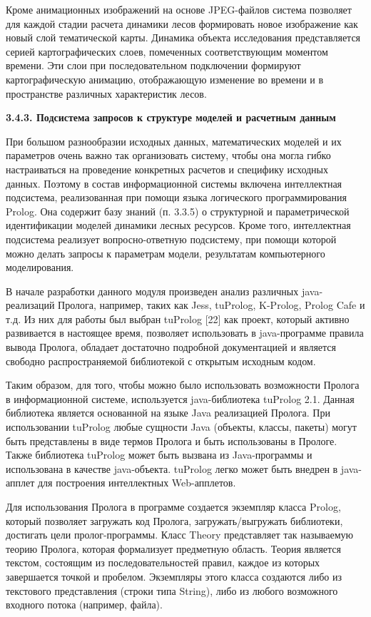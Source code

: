\documentclass{article}
\begin{document}
Кроме анимационных изображений на основе JPEG-файлов 
система позволяет для каждой стадии расчета 
динамики лесов формировать новое изображение 
как новый слой тематической карты. Динамика 
объекта исследования представляется серией 
картографических слоев, помеченных соответствующим 
моментом времени. Эти слои при последовательном 
подключении формируют картографическую анимацию, 
отображающую изменение во времени и в пространстве 
различных характеристик лесов.\label{HToc128995783}\label{HToc199746739}

\textbf{3.4.3. Подсистема запросов к структуре моделей 
и расчетным данным }

При большом разнообразии исходных данных, математических 
моделей и их параметров очень важно так организовать 
систему, чтобы она могла гибко настраиваться 
на проведение конкретных расчетов и специфику 
исходных данных. Поэтому в состав информационной 
системы включена интеллектная подсистема, 
реализованная при помощи языка логического 
программирования Prolog. Она содержит базу знаний 
(п. 3.3.5) \label{OLEHLINK36}\label{OLEHLINK37}о структурной и параметрической 
идентификации моделей динамики лесных ресурсов. 
Кроме того, интеллектная подсистема реализует 
вопросно-ответную подсистему, при помощи которой 
можно делать запросы к параметрам модели, результатам 
компьютерного моделирования.

В начале разработки данного модуля произведен 
анализ различных java-реализаций Пролога, например, 
таких как Jess, tuProlog, K-Prolog, Prolog Cafe и т.д. Из них для 
работы был выбран tuProlog [22] как проект, который 
активно развивается в настоящее время, позволяет 
использовать в java-программе правила вывода 
Пролога, обладает достаточно подробной документацией 
и является свободно распространяемой библиотекой 
с открытым исходным кодом.

Таким образом, для того, чтобы можно было использовать 
возможности Пролога в информационной системе, 
используется java-библиотека \label{OLEHLINK2}tuProlog 2.1. 
Данная библиотека является основанной на языке 
Java реализацией Пролога. При использовании tuProlog 
любые сущности Java (объекты, классы, пакеты) могут 
быть представлены в виде термов Пролога и быть 
использованы в Прологе. Также библиотека tuProlog 
может быть вызвана из Java-программы и использована 
в качестве java-объекта. tuProlog легко может быть 
внедрен в java-апплет для построения интеллектных 
Web-апплетов.

Для использования Пролога в программе создается 
экземпляр класса Prolog, который позволяет загружать 
код Пролога, загружать/выгружать библиотеки, 
достигать цели пролог-программы. Класс Theory 
представляет так называемую теорию Пролога, 
которая формализует предметную область. Теория 
является текстом, состоящим из последовательностей 
правил, каждое из которых завершается точкой 
и пробелом. Экземпляры этого класса создаются 
либо из текстового представления (строки типа 
String), либо из любого возможного входного потока 
(например, файла).
\end{document}
